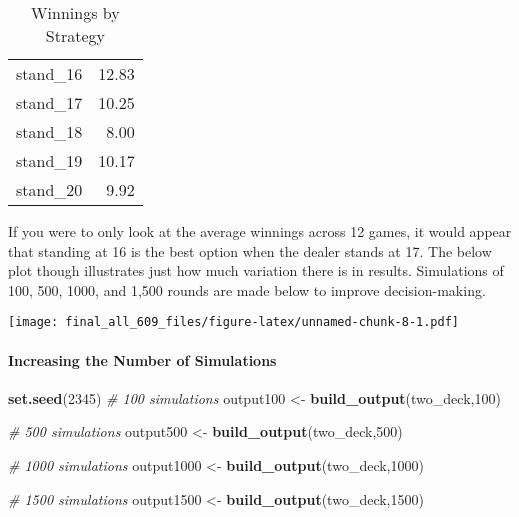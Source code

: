 \documentclass[]{article}
\newenvironment{Shaded}{\begin{snugshade}}{\end{snugshade}}
\newcommand{\KeywordTok}[1]{\textcolor[rgb]{0.13,0.29,0.53}{\textbf{#1}}}
\newcommand{\DecValTok}[1]{\textcolor[rgb]{0.00,0.00,0.81}{#1}}
\newcommand{\StringTok}[1]{\textcolor[rgb]{0.31,0.60,0.02}{#1}}
\newcommand{\CommentTok}[1]{\textcolor[rgb]{0.56,0.35,0.01}{\textit{#1}}}
\newcommand{\OperatorTok}[1]{\textcolor[rgb]{0.81,0.36,0.00}{\textbf{#1}}}
\newcommand{\NormalTok}[1]{#1}
\let\oldparagraph\paragraph
\renewcommand{\paragraph}[1]{\oldparagraph{#1}\mbox{}}
\begin{document}
\begin{Shaded}
\end{Shaded}

\begin{longtable}[]{@{}lr@{}}
\caption{Winnings by Strategy}\tabularnewline
\toprule
stand\_16 & 12.83\tabularnewline
stand\_17 & 10.25\tabularnewline
stand\_18 & 8.00\tabularnewline
stand\_19 & 10.17\tabularnewline
stand\_20 & 9.92\tabularnewline
\bottomrule
\end{longtable}

If you were to only look at the average winnings across 12 games, it
would appear that standing at 16 is the best option when the dealer
stands at 17. The below plot though illustrates just how much variation
there is in results. Simulations of 100, 500, 1000, and 1,500 rounds are
made below to improve decision-making.

\texttt{[image: final\_all\_609\_files/figure-latex/unnamed-chunk-8-1.pdf]}

\paragraph{Increasing the Number of
Simulations}\label{increasing-the-number-of-simulations}

\begin{Shaded}
\begin{Highlighting}[]
\KeywordTok{set.seed}\NormalTok{(}\DecValTok{2345}\NormalTok{)}
\CommentTok{# 100 simulations}
\NormalTok{output100 <-}\StringTok{ }\KeywordTok{build_output}\NormalTok{(two_deck,}\DecValTok{100}\NormalTok{)}

\CommentTok{# 500 simulations}
\NormalTok{output500 <-}\StringTok{ }\KeywordTok{build_output}\NormalTok{(two_deck,}\DecValTok{500}\NormalTok{)}

\CommentTok{# 1000 simulations}
\NormalTok{output1000 <-}\StringTok{ }\KeywordTok{build_output}\NormalTok{(two_deck,}\DecValTok{1000}\NormalTok{)}

\CommentTok{# 1500 simulations}
\NormalTok{output1500 <-}\StringTok{ }\KeywordTok{build_output}\NormalTok{(two_deck,}\DecValTok{1500}\NormalTok{)}
\end{Highlighting}
\end{Shaded}
\end{document}
